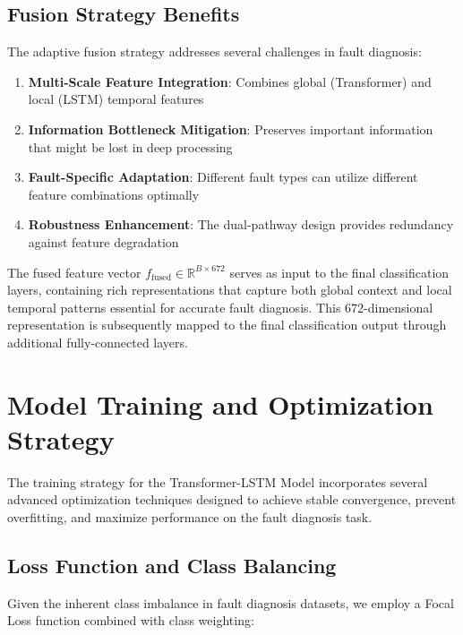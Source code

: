 \subsection{Fusion Strategy Benefits}
\label{subsec:fusion_benefits}

The adaptive fusion strategy addresses several challenges in fault diagnosis:

\begin{enumerate}
    \item \textbf{Multi-Scale Feature Integration}: Combines global (Transformer) and local (LSTM) temporal features
    \item \textbf{Information Bottleneck Mitigation}: Preserves important information that might be lost in deep processing
    \item \textbf{Fault-Specific Adaptation}: Different fault types can utilize different feature combinations optimally
    \item \textbf{Robustness Enhancement}: The dual-pathway design provides redundancy against feature degradation
\end{enumerate}

The fused feature vector $f_{\text{fused}} \in \mathbb{R}^{B \times 672}$ serves as input to the final classification layers, containing rich representations that capture both global context and local temporal patterns essential for accurate fault diagnosis. This 672-dimensional representation is subsequently mapped to the final classification output through additional fully-connected layers.

\section{Model Training and Optimization Strategy}
\label{sec:hybrid_model:training_optimization}

The training strategy for the Transformer-LSTM Model incorporates several advanced optimization techniques designed to achieve stable convergence, prevent overfitting, and maximize performance on the fault diagnosis task.

\subsection{Loss Function and Class Balancing}
\label{subsec:loss_function}

Given the inherent class imbalance in fault diagnosis datasets, we employ a Focal Loss function combined with class weighting:

